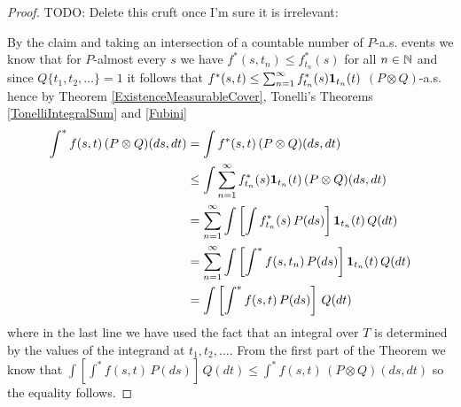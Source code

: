 \begin{proof}
TODO: Delete this cruft once I'm sure it is irrelevant:

By the claim and taking an intersection of a countable number of $P$-a.s. events we know that for $P$-almost every $s$ we have $f^*(s,t_n) \leq f_{t_n}^*(s)$ for all $n \in \mathbb{N}$ and since $Q\lbrace t_1, t_2, \dotsc \rbrace = 1$ it follows that $f^*(s,t) \leq \sum_{n=1}^\infty f_{t_n}^*(s) \textbf{1}_{t_n}(t)$ $(P \otimes Q)$-a.s.   
hence by Theorem \ref{ExistenceMeasurableCover}, Tonelli's Theorems \ref{TonelliIntegralSum}  and \ref{Fubini} 
\begin{align*}
\int^* f(s,t) \,  (P \otimes Q)(ds,dt) &= \int f^*(s,t) \, (P \otimes Q)(ds,dt)  \\
&\leq \int \sum_{n=1}^\infty f_{t_n}^*(s) \textbf{1}_{t_n}(t) \,  (P \otimes Q)(ds,dt) \\
&= \sum_{n=1}^\infty\int \left [ \int f_{t_n}^*(s) \, P(ds) \right ] \textbf{1}_{t_n}(t) \,   Q(dt)\\
&= \sum_{n=1}^\infty \int \left [ \int^* f(s, t_n) \, P(ds) \right ] \textbf{1}_{t_n}(t) \,   Q(dt)\\
&= \int \left [ \int^* f(s, t) \, P(ds) \right ] \,   Q(dt)\\
\end{align*}
where in the last line we have used the fact that an integral over $T$ is determined by the values of the integrand at $t_1, t_2, \dotsc$.  From the first part of the Theorem we know that $\int \left [ \int^* f(s, t) \, P(ds) \right ] \,   Q(dt) \leq \int^* f(s,t) \,  (P \otimes Q)(ds,dt)$ so the equality follows.

\end{proof}


